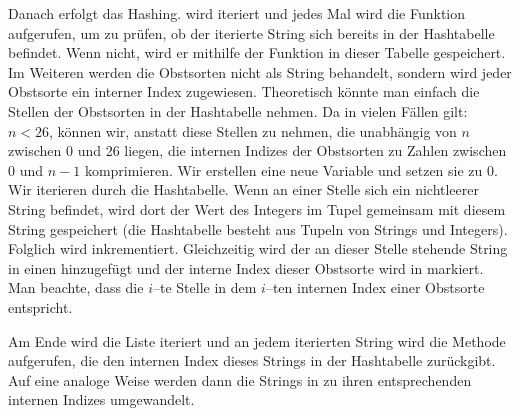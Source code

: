 Danach erfolgt das Hashing.  wird iteriert und jedes Mal wird
die Funktion  aufgerufen, um zu prüfen, ob der iterierte String sich bereits
in der Hashtabelle befindet. Wenn nicht, wird er mithilfe der Funktion  
in dieser Tabelle gespeichert.\\
Im Weiteren werden die Obstsorten nicht als String behandelt, sondern wird jeder Obstsorte
ein interner Index zugewiesen. Theoretisch könnte man einfach die Stellen der Obstsorten in der Hashtabelle 
nehmen.
Da in vielen Fällen gilt: $n < 26$, können wir, anstatt diese Stellen zu nehmen, die unabhängig von $n$
zwischen 0 und 26 liegen, die internen Indizes der Obstsorten zu Zahlen zwischen 0 und $n-1$
komprimieren. Wir erstellen eine neue Variable  und setzen sie zu 0. Wir iterieren durch die Hashtabelle. 
Wenn an einer Stelle sich ein nichtleerer String befindet, wird dort der Wert des Integers
im Tupel gemeinsam mit diesem String gespeichert (die Hashtabelle besteht aus Tupeln von Strings und Integers). 
Folglich wird  inkrementiert.
Gleichzeitig wird der an dieser Stelle stehende String in einen   hinzugefügt und
der interne Index dieser Obstsorte wird in  markiert.
Man beachte, dass die $i$--te Stelle in  dem $i$--ten internen Index einer Obstsorte entspricht. 

Am Ende wird die Liste  iteriert und an jedem iterierten String wird
die Methode  aufgerufen, die den internen Index dieses Strings in der Hashtabelle zurückgibt.
Auf eine analoge Weise werden dann die Strings in  zu ihren entsprechenden
internen Indizes umgewandelt.




